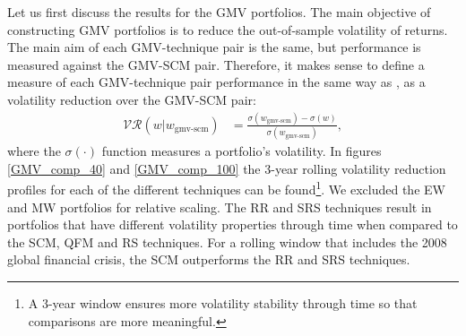 \documentclass[a4paper,11pt,nocenter,bold,noupper,headcount]{mythesis}
\theoremstyle{plain}
\theoremstyle{definition}
\begin{document}
Let us first discuss the results for the GMV portfolios. The main objective of constructing GMV portfolios is to reduce the out-of-sample volatility of returns. The main aim of each GMV-technique pair is the same, but performance is measured against the GMV-SCM pair. Therefore, it makes sense to define a measure of each GMV-technique pair performance in the same way as \cite{RR15}, as a volatility reduction over the GMV-SCM pair:
\begin{align}
\mathcal{VR}(w|w_{\text{gmv-scm}}) & = \frac{\sigma(w_{\text{gmv-scm}}) - \sigma(w)}{\sigma(w_{\text{gmv-scm}})},
\end{align}
where the $\sigma(\cdot)$ function measures a portfolio's volatility. In figures \ref{GMV_comp_40} and \ref{GMV_comp_100} the 3-year rolling volatility reduction profiles for each of the different techniques can be found\footnote{A 3-year window ensures more volatility stability through time so that comparisons are more meaningful.}. We excluded the EW and MW portfolios for relative scaling. The RR and SRS techniques result in portfolios that have different volatility properties through time when compared to the SCM, QFM and RS techniques. For a rolling window that includes the 2008 global financial crisis, the SCM outperforms the RR and SRS techniques. 
\end{document}
